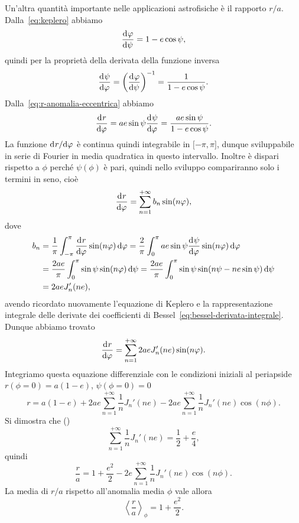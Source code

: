 Un'altra quantità importante nelle applicazioni astrofisiche è il rapporto
$r/a$. Dalla~\eqref{eq:keplero} abbiamo
\begin{equation}
  \frac{{\mathop{}\!\mathrm{d}^{}}\varphi}{\mathop{}\!\mathrm{d} {\psi}^{}} = 1 -e\cos\psi,
\end{equation}
quindi per la proprietà della derivata della funzione inversa
\begin{equation}
  \frac{{\mathop{}\!\mathrm{d}^{}}\psi}{\mathop{}\!\mathrm{d} {\varphi}^{}} =
  \left(
    \frac{{\mathop{}\!\mathrm{d}^{}}\varphi}{\mathop{}\!\mathrm{d} {\psi}^{}}
  \right)^{-1} = \frac{1}{1 - e\cos\psi}.
\end{equation}
Dalla~\eqref{eq:r-anomalia-eccentrica} abbiamo
\begin{equation}
  \frac{{\mathop{}\!\mathrm{d}^{}}r}{\mathop{}\!\mathrm{d} {\varphi}^{}} = ae\sin\psi\frac{{\mathop{}\!\mathrm{d}^{}}\psi}{\mathop{}\!\mathrm{d} {\varphi}^{}} = \frac{ae\sin\psi}{1-e\cos\psi}.
\end{equation}
La funzione $\mathrm{d}^{}r / \mathrm{d} {\varphi}^{}$ è continua quindi integrabile in $\mathopen{[}-\pi,
\pi\mathclose{]}$, dunque sviluppabile in serie di Fourier in media quadratica
in questo intervallo. Inoltre è dispari rispetto a $\phi$ perché $\psi(\phi)$ è
pari, quindi nello sviluppo compariranno solo i termini in seno, cioè
\begin{equation}
  \frac{{\mathop{}\!\mathrm{d}^{}}r}{\mathop{}\!\mathrm{d} {\varphi}^{}} = \sum_{n=1}^{+\infty}b_n\sin(n\varphi),
\end{equation}
dove
\begin{equation}
  \begin{split}
    b_n &= \frac{1}{\pi}\int_{-\pi}^\pi \toder{r}{\phi}\sin(n\phi)\dd\phi =
    \frac{2}{\pi}\int_0^\pi ae\sin\psi\toder{\psi}{\phi}\sin(n\phi)\dd\phi \\
    &= \frac{2ae}{\pi}\int_0^\pi \sin\psi\sin(n\phi)\dd\psi = \frac{2ae}{\pi}
    \int_0^\pi \sin\psi\sin(n\psi - ne\sin\psi)\dd\psi \\
    &= 2aeJ_n'(ne),
  \end{split}
\end{equation}
avendo ricordato nuovamente l'equazione di Keplero e la rappresentazione
integrale delle derivate dei coefficienti di
Bessel~\eqref{eq:bessel-derivata-integrale}. Dunque abbiamo trovato
\begin{equation}
  \frac{{\mathop{}\!\mathrm{d}^{}}r}{\mathop{}\!\mathrm{d} {\varphi}^{}} = \sum_{n=1}^{+\infty} 2aeJ_n'(ne)\sin(n\varphi).
\end{equation}
Integriamo questa equazione differenziale con le condizioni iniziali al
periapside $r(\phi=0) = a(1-e)$, $\psi(\phi=0)=0$
\begin{equation}
  r = a(1-e) + 2ae\sum_{n=1}^{+\infty}\frac{1}{n}J_n'(ne) -
  2ae\sum_{n=1}^{+\infty}\frac{1}{n}J_n'(ne)\cos(n\phi).
\end{equation}
Si dimostra che (\textcite{watson:bessel})
\begin{equation}
  \sum_{n=1}^{+\infty}\frac{1}{n}J_n'(ne) = \frac{1}{2} + \frac{e}{4},
\end{equation}
quindi
\begin{equation}
  \label{eq:r-su-a-bessel}
  \frac{r}{a} = 1 + \frac{e^2}{2} - 2e \sum_{n=1}^{+\infty} \frac{1}{n} J_n'(ne)
  \cos(n\phi).
\end{equation}
La media di $r/a$ rispetto all'anomalia media $\phi$ vale allora
\begin{equation}
  \left\langle \frac{r}{a} \right\rangle_\phi = 1 + \frac{e^2}{2}.
\end{equation}

